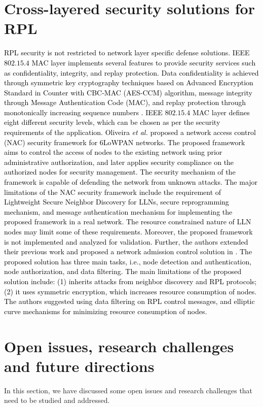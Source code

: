 \documentclass[10pt,journal,sort & compress]{IEEEtran}
\begin{document}
\color{black}
\twocolumn
\section{Cross-layered security solutions for RPL}\label{crosslayered}
\textcolor{black}{RPL security is not restricted to network layer specific defense solutions. IEEE $ 802.15.4 $ MAC layer implements several features to provide security services such as confidentiality, integrity, and replay protection. Data confidentiality is achieved through symmetric key cryptography techniques based on Advanced Encryption Standard in Counter with CBC-MAC (AES-CCM) algorithm, message integrity through Message Authentication Code (MAC), and replay protection through monotonically increasing sequence numbers \cite{Perazzo2017,sastry2004security, amin2016comprehensive}. IEEE $ 802.15.4 $ MAC layer defines eight different security levels, which can be chosen as per the security requirements of the application. Oliveira \textit{et al.} \cite{oliveira2013NACF} proposed a network access control (NAC) security framework for 6LoWPAN networks. The proposed framework aims to control the access of nodes to the existing network using prior administrative authorization, and later applies security compliance on the authorized nodes for security management. The security mechanism of the framework is capable of defending the network from unknown attacks. The major limitations of the NAC security framework include the requirement of Lightweight Secure Neighbor Discovery for LLNs, secure reprogramming mechanism, and message authentication mechanism for implementing the proposed framework in a real network. The resource constrained nature of LLN nodes may limit some of these requirements. Moreover, the proposed framework is not implemented and analyzed for validation. Further, the authors extended their previous work \cite{oliveira2013NACF} and proposed a network admission control solution in \cite{oliveira2013NAC1,oliveira2016NAC2}. The proposed solution has three main tasks, i.e., node detection and authentication, node authorization, and data filtering. The main limitations of the proposed solution include: (1) inherits attacks from neighbor discovery and RPL protocols; (2) it uses symmetric encryption, which increases resource consumption of nodes. The authors suggested using data filtering on RPL control messages, and elliptic curve mechanisms for minimizing resource consumption of nodes.}             



\section{Open issues, research challenges and future directions}\label{Open issues and research challenges}
In this section, we have discussed some open issues and research challenges that need to be studied and addressed. 
\end{document}
